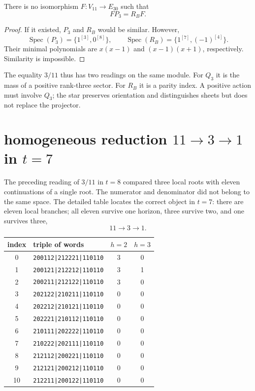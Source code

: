 \begin{theorem}
\label{thm:no-go-proyector-estrella}
There is no isomorphism \(F:V_{11}\to E_{30}\) such that
\[
 FP_3=R_BF.
\]
\end{theorem}

\begin{proof}
If it existed, \(P_3\) and \(R_B\) would be similar. However,
\[
 \operatorname{Spec}(P_3)=\{1^{[3]},0^{[8]}\},
 \qquad
 \operatorname{Spec}(R_B)=\{1^{[7]},(-1)^{[4]}\}.
\]
Their minimal polynomials are \(x(x-1)\) and
\((x-1)(x+1)\), respectively. Similarity is impossible.
\end{proof}

The equality \(3/11\) thus has two readings on the same module. For
\(Q_3\) it is the mass of a positive rank-three sector. For \(R_B\) it is
a parity index. A positive action must involve \(Q_3\); the
star preserves orientation and distinguishes sheets but does not replace the
projector.

\section{homogeneous reduction \texorpdfstring{\(11\to3\to1\)}{11-3-1} in \texorpdfstring{\(t=7\)}{t=7}}

The preceding reading of \(3/11\) in \(t=8\) compared three local roots
with eleven continuations of a single root. The numerator and denominator did not
belong to the same space. The detailed table locates the correct object
in \(t=7\): there are eleven local branches; all eleven survive one horizon, three
survive two, and one survives three,
\[
 \boxed{11\longrightarrow3\longrightarrow1.}
\]

\begin{center}
\small
\begin{tabularx}{\textwidth}{cYcc}
\toprule
index&triple of words&\(h=2\)&\(h=3\)\\
&\texttt{200112|212221|110110}&3&0\\
1&\texttt{200121|212212|110110}&3&1\\
2&\texttt{200211|212122|110110}&3&0\\
3&\texttt{202122|210211|110110}&0&0\\
4&\texttt{202212|210121|110110}&0&0\\
5&\texttt{202221|210112|110110}&0&0\\
6&\texttt{210111|202222|110110}&0&0\\
7&\texttt{210222|202111|110110}&0&0\\
8&\texttt{212112|200221|110110}&0&0\\
9&\texttt{212121|200212|110110}&0&0\\
10&\texttt{212211|200122|110110}&0&0\\
\bottomrule
\end{tabularx}
\end{center}

